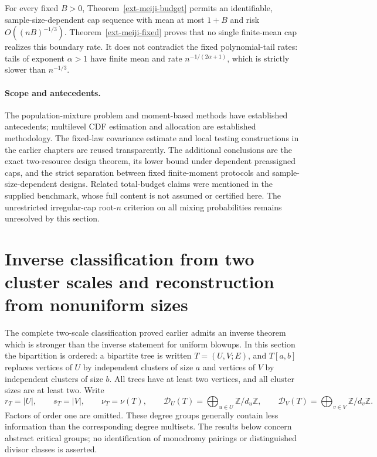 \documentclass[11pt,a4paper]{article}
\theoremstyle{definition}\newtheorem{definition}[theorem]{Definition}
\theoremstyle{remark}\newtheorem{remark}[theorem]{Remark}
\newcommand{\Z}{\mathbb Z}\newcommand{\Q}{\mathbb Q}\newcommand{\F}{\mathbb F}
\numberwithin{equation}{section}
\begin{document}
For every fixed $B>0$, Theorem~\ref{ext-meiji-budget} permits an
identifiable, sample-size-dependent cap sequence with mean at most
$1+B$ and risk $O((nB)^{-1/3})$. Theorem~\ref{ext-meiji-fixed} proves
that no single finite-mean cap realizes this boundary rate. It does not
contradict the fixed polynomial-tail rates: tails of exponent
$\alpha>1$ have finite mean and rate $n^{-1/(2\alpha+1)}$, which is
strictly slower than $n^{-1/3}$.

\paragraph{Scope and antecedents.}
The population-mixture problem and moment-based methods have established
antecedents\cite{ref014,ref015}; multilevel CDF estimation
and allocation are established methodology\cite{ref020}.
The fixed-law covariance estimate and local testing constructions in the
earlier chapters are reused transparently. The additional conclusions are
the exact two-resource design theorem, its lower bound under dependent
preassigned caps, and the strict separation between fixed finite-moment
protocols and sample-size-dependent designs. Related total-budget claims
were mentioned in the supplied benchmark, whose full content is not
assumed or certified here. The unrestricted irregular-cap root-$n$
criterion on all mixing probabilities remains unresolved by this section.


\clearpage
{}
\section{Inverse classification from two cluster scales and reconstruction from nonuniform sizes}
\label{ext-keio-section}

The complete two-scale classification proved earlier admits an inverse theorem
which is stronger than the inverse statement for uniform blowups.  In this
section the bipartition is ordered: a bipartite tree is written
$T=(U,V;E)$, and $T[a,b]$ replaces vertices of $U$ by independent clusters of
size $a$ and vertices of $V$ by independent clusters of size $b$.  All trees
have at least two vertices, and all cluster sizes are at least two.  Write
\[
 r_T=|U|,\qquad s_T=|V|,\qquad \nu_T=\nu(T),\qquad
 \mathcal D_U(T)=\bigoplus_{u\in U}\Z/d_u\Z,\qquad
 \mathcal D_V(T)=\bigoplus_{v\in V}\Z/d_v\Z.
\]
Factors of order one are omitted.  These degree groups generally contain less
information than the corresponding degree multisets.  The results below
concern abstract critical groups; no identification of monodromy pairings or
distinguished divisor classes is asserted.
\end{document}
